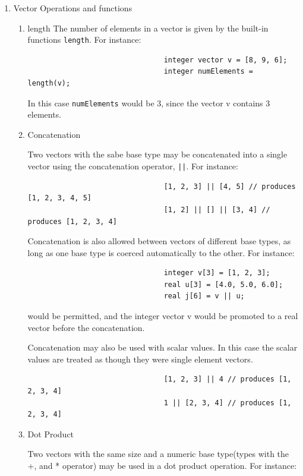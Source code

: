 \documentclass{article}
\begin{document}
			\begin{enumerate}
				\item Vector Operations and functions
					\begin{enumerate}
						\item length
							The number of elements in a vector is given by the built-in functions \texttt{length}. For
							instance:

							\begin{lstlisting}
								integer vector v = [8, 9, 6];
								integer numElements = length(v);
							\end{lstlisting}

							In this case \texttt{numElements} would be 3, since the vector v contains 3 elements.

						\item Concatenation

							Two vectors with the sabe base type may be concatenated into a single vector using the
							concatenation operator, \texttt{||}. For instance:

							\begin{lstlisting}
								[1, 2, 3] || [4, 5] // produces [1, 2, 3, 4, 5]
								[1, 2] || [] || [3, 4] // produces [1, 2, 3, 4]
							\end{lstlisting}

							Concatenation is also allowed between vectors of different base types, as long as one base
							type is coerced automatically to the other. For instance:

							\begin{lstlisting}
								integer v[3] = [1, 2, 3];
								real u[3] = [4.0, 5.0, 6.0];
								real j[6] = v || u;
							\end{lstlisting}

							would be permitted, and the integer vector v would be promoted to a real vector before the
							concatenation.

							Concatenation may also be used with scalar values. In this case the scalar values are
							treated as though they were single element vectors.

							\begin{lstlisting}
								[1, 2, 3] || 4 // produces [1, 2, 3, 4]
								1 || [2, 3, 4] // produces [1, 2, 3, 4]
							\end{lstlisting}

						\item Dot Product

							Two vectors with the same size and a numeric base type(types with the +, and * operator)
							may be used in a dot product operation. For instance:


\end{enumerate}
\end{enumerate}
\end{document}

